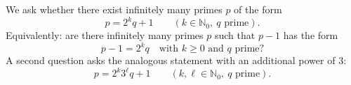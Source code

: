 We ask whether there exist infinitely many primes $p$ of the form
\[
  p = 2^k q + 1 \qquad (k \in \mathbb{N}_0,\ q \text{ prime}).
\]
Equivalently: are there infinitely many primes $p$ such that $p-1$ has the form
\[
  p-1 = 2^k q \quad\text{with $k\ge 0$ and $q$ prime?}
\]
A second question asks the analogous statement with an additional power of $3$:
\[
  p = 2^k 3^\ell q + 1 \qquad (k,\ell \in \mathbb{N}_0,\ q \text{ prime}).
\]
